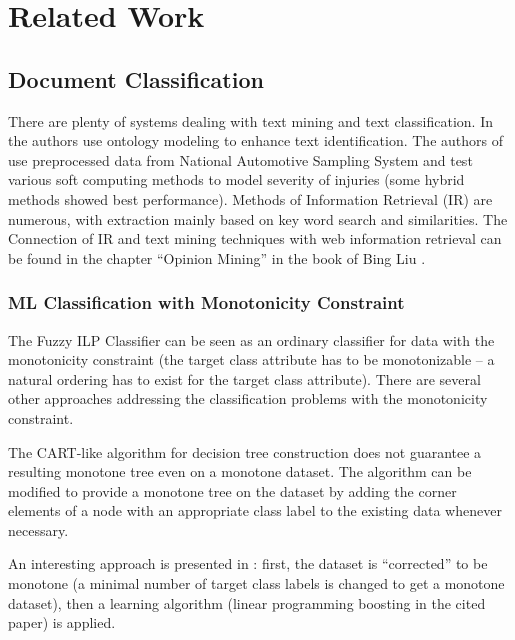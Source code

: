 \chapter{Related Work}


\section{Document Classification} \label{sec:ch20_doc_classification}

There are plenty of systems dealing with text mining and text classification. In \citep{biblio:ReYaLiOntoText08} the authors use ontology modeling to enhance text identification. The authors of \citep{biblio:CAP} use preprocessed data from National Automotive Sampling System and test various soft computing methods to model severity of injuries (some hybrid methods showed best performance). Methods of Information Retrieval (IR) are numerous, with extraction mainly based on key word search and similarities. The Connection of IR and text mining techniques with web information retrieval can be found in the chapter ``Opinion Mining'' in the book of Bing Liu \citep{biblio:WebDataMining}. 

\subsection{ML Classification with Monotonicity Constraint}
The Fuzzy ILP Classifier can be seen as an ordinary classifier for data with the monotonicity constraint (the target class attribute has to be monotonizable -- a natural ordering has to exist for the target class attribute). There are several other approaches addressing the classification problems with the monotonicity constraint.

The CART-like algorithm for decision tree construction does not guarantee a resulting monotone tree even on a monotone dataset. The algorithm can be modified \citep{biblio:mon_trees} to provide a monotone tree on the dataset by adding the corner elements of a node with an appropriate class label to the existing data whenever necessary.

An interesting approach is presented in \citep{biblio:mon_transf}: first, the dataset is ``corrected'' to be monotone (a minimal number of target class labels is changed to get a monotone dataset), then a learning algorithm (linear programming boosting in the cited paper) is applied.

